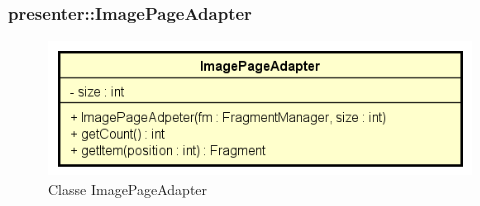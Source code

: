 \documentclass[../DefinizioneDiProdotto.tex]{subfiles}
\begin{document}
\subsubsection{presenter::ImagePageAdapter}

    \begin{figure}[H]
        \centering
        \includegraphics{img/ImagePageAdapter.png}
        \caption{Classe ImagePageAdapter}\label{fig:presenter::ImagePageAdapter} 
    \end{figure}
\end{document}
